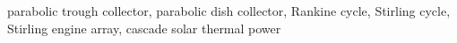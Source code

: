 {%



}
\enkeywords
{parabolic trough collector, parabolic dish collector, Rankine cycle, Stirling cycle, Stirling engine array, cascade solar thermal power}